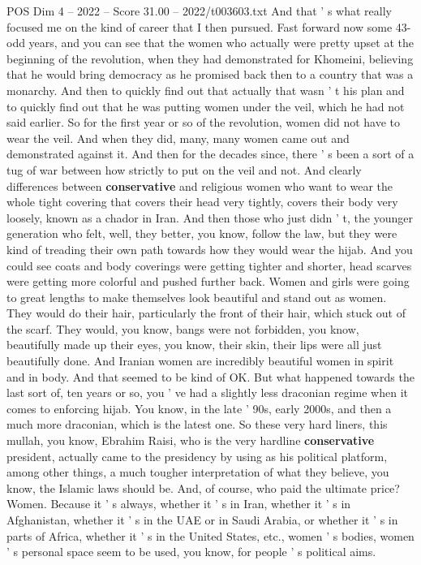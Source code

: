\begin{textsample}{POS Dim 4 – 2022 – Score 31.00 – 2022/t003603.txt}
And that ' s what really focused me on the kind of career that I then pursued.
Fast forward now some 43-odd years, and you can see that the women who actually were pretty upset at the beginning of the revolution, when they had demonstrated for Khomeini, believing that he would bring democracy as he promised back then to a country that was a monarchy.
And then to quickly find out that actually that wasn ' t his plan and to quickly find out that he was putting women under the veil, which he had not said earlier.
So for the first year or so of the revolution, women did not have to wear the veil.
And when they did, many, many women came out and demonstrated against it.
And then for the decades since, there ' s been a sort of a tug of war between how strictly to put on the veil and not.
And clearly differences between \textbf{conservative} and religious women who want to wear the whole tight covering that covers their head very tightly, covers their body very loosely, known as a chador in Iran.
And then those who just didn ' t, the younger generation who felt, well, they better, you know, follow the law, but they were kind of treading their own path towards how they would wear the hijab.
And you could see coats and body coverings were getting tighter and shorter, head scarves were getting more colorful and pushed further back.
Women and girls were going to great lengths to make themselves look beautiful and stand out as women.
They would do their hair, particularly the front of their hair, which stuck out of the scarf.
They would, you know, bangs were not forbidden, you know, beautifully made up their eyes, you know, their skin, their lips were all just beautifully done.
And Iranian women are incredibly beautiful women in spirit and in body.
And that seemed to be kind of OK.
But what happened towards the last sort of, ten years or so, you ' ve had a slightly less draconian regime when it comes to enforcing hijab.
You know, in the late ' 90s, early 2000s, and then a much more draconian, which is the latest one.
So these very hard liners, this mullah, you know, Ebrahim Raisi, who is the very hardline \textbf{conservative} president, actually came to the presidency by using as his political platform, among other things, a much tougher interpretation of what they believe, you know, the Islamic laws should be.
And, of course, who paid the ultimate price?
Women.
Because it ' s always, whether it ' s in Iran, whether it ' s in Afghanistan, whether it ' s in the UAE or in Saudi Arabia, or whether it ' s in parts of Africa, whether it ' s in the United States, etc., women ' s bodies, women ' s personal space seem to be used, you know, for people ' s political aims.

\end{textsample}
